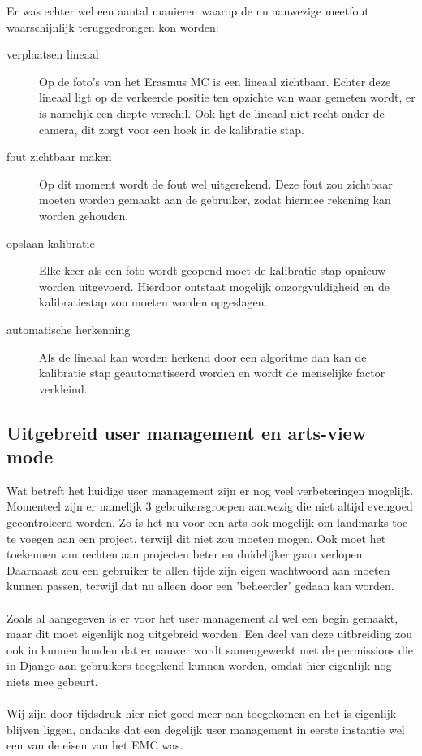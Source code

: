 Er was echter wel een aantal manieren waarop de nu aanwezige meetfout waarschijnlijk teruggedrongen kon worden:
\begin{description}
	\item[verplaatsen lineaal] Op de foto's van het Erasmus MC is een lineaal zichtbaar. 
	Echter deze lineaal ligt op de verkeerde positie ten opzichte van waar gemeten wordt, er is namelijk een diepte verschil. 
	Ook ligt de lineaal niet recht onder de camera, dit zorgt voor een hoek in de kalibratie stap.
	\item[fout zichtbaar maken] Op dit moment wordt de fout wel uitgerekend. 
	Deze fout zou zichtbaar moeten worden gemaakt aan de gebruiker, zodat hiermee rekening kan worden gehouden.
	\item[opslaan kalibratie] Elke keer als een foto wordt geopend moet de kalibratie stap opnieuw worden uitgevoerd. 
	Hierdoor ontstaat mogelijk onzorgvuldigheid en de kalibratiestap zou moeten worden opgeslagen.
	\item[automatische herkenning] Als de lineaal kan worden herkend door een algoritme dan kan de kalibratie stap geautomatiseerd worden en wordt de menselijke factor verkleind.
\end{description}

\subsection{Uitgebreid user management en arts-view mode} %
Wat betreft het huidige user management zijn er nog veel verbeteringen mogelijk.
Momenteel zijn er namelijk 3 gebruikersgroepen aanwezig die niet altijd evengoed gecontroleerd worden.
Zo is het nu voor een arts ook mogelijk om landmarks toe te voegen aan een project, terwijl dit niet zou moeten mogen.
Ook moet het toekennen van rechten aan projecten beter en duidelijker gaan verlopen.
Daarnaast zou een gebruiker te allen tijde zijn eigen wachtwoord aan moeten kunnen passen, terwijl dat nu alleen door een 'beheerder' gedaan kan worden.
\\
\\
Zoals al aangegeven is er voor het user management al wel een begin gemaakt, maar dit moet eigenlijk nog uitgebreid worden.
Een deel van deze uitbreiding zou ook in kunnen houden dat er nauwer wordt samengewerkt met de permissions die in Django aan gebruikers toegekend kunnen worden, omdat hier eigenlijk nog niets mee gebeurt.
\\
\\
Wij zijn door tijdsdruk hier niet goed meer aan toegekomen en het is eigenlijk blijven liggen, ondanks dat een degelijk user management in eerste instantie wel een van de eisen van het EMC was.

